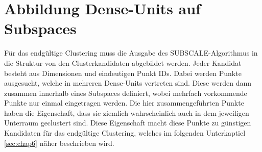 \section{Abbildung Dense-Units auf Subspaces}\label{sec:chap5}

Für das endgültige Clustering muss die Ausgabe des SUBSCALE-Algorithmus in die Struktur von den Clusterkandidaten abgebildet werden. Jeder Kandidat besteht aus Dimensionen und eindeutigen Punkt IDs. Dabei werden Punkte ausgesucht, welche in mehreren Dense-Units vertreten sind. Diese werden dann zusammen innerhalb eines Subspaces definiert, wobei mehrfach vorkommende Punkte nur einmal eingetragen werden. Die hier zusammengeführten Punkte haben die Eigenschaft, dass sie ziemlich wahrscheinlich auch in dem jeweiligen Unterraum geclustert sind. Diese Eigenschaft macht diese Punkte zu günstigen Kandidaten für das endgültige Clustering, welches im folgenden Unterkaptiel \ref{sec:chap6} näher beschrieben wird.
